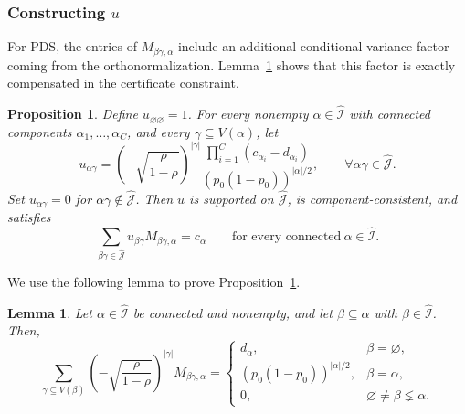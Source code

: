 \documentclass[11pt, letterpaper]{article}
\newtheorem{lemma}[theorem]{Lemma}
\newtheorem{proposition}[theorem]{Proposition}
\numberwithin{equation}{section}
\newcommand{\goodI}{\widehat{\mathcal{I}}}
\newcommand{\goodJ}{\widehat{\mathcal{J}}}
\begin{document}
\subsubsection*{Constructing $u$}
For PDS, the entries of $M_{\beta\gamma,\alpha}$ include an additional conditional-variance factor coming from the orthonormalization. Lemma~\ref{lem:pds-cancellation} shows that this factor is exactly compensated in the certificate constraint.
\begin{proposition}\label{prop:u-PDS}
    Define $u_{\varnothing\varnothing}=1$. For every nonempty $\alpha\in\goodI$ with connected components
$\alpha_1,\ldots,\alpha_C$, and every $\gamma\subseteq V(\alpha)$, let
    \begin{equation*}
        u_{\alpha\gamma}=\left(-\sqrt{\frac{\rho}{1-\rho}}\right)^{|\gamma|} \frac{\prod_{i=1}^C (c_{\alpha_i}-d_{\alpha_i})}{(p_0(1-p_0))^{|\alpha|/2}}, \qquad \forall \alpha\gamma\in \goodJ.
    \end{equation*}
    Set $u_{\alpha\gamma}=0$ for $\alpha\gamma\notin\goodJ$. Then $u$ is supported on $\goodJ$, is component-consistent, and satisfies
\[
\sum_{\beta\gamma\in\goodJ}
u_{\beta\gamma}M_{\beta\gamma,\alpha}
=
c_\alpha \qquad \text{for every connected} \ \alpha \in \goodI.
\]
\end{proposition}
We use the following lemma to prove Proposition~\ref{prop:u-PDS}.
\begin{lemma}\label{lem:pds-cancellation}
    Let $\alpha\in\widehat{\mathcal I}$ be connected and nonempty, and let $\beta\subseteq\alpha$ with $\beta\in\widehat{\mathcal I}$. Then,
    \[\sum_{\gamma \subseteq V(\beta)}\left(-\sqrt{\frac{\rho}{1-\rho}}\right)^{|\gamma|}M_{\beta\gamma,\alpha}=\begin{cases}
        d_\alpha, & \beta=\varnothing,\\
        \left(p_0(1-p_0)\right)^{|\alpha|/2}, & \beta=\alpha,\\
        0, & \varnothing\neq\beta\lneq\alpha.
    \end{cases}\]
\end{lemma}
\end{document}
